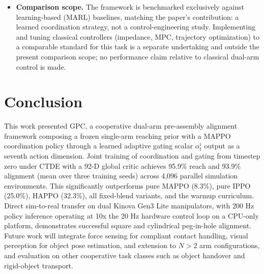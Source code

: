 \documentclass[a4paper,fleqn]{cas-dc}
\begin{document}
\begin{itemize}
\item \textbf{Comparison scope.} The framework is benchmarked exclusively against learning-based (MARL) baselines, matching the paper's contribution: a learned coordination strategy, not a control-engineering study. Implementing and tuning classical controllers (impedance, MPC, trajectory optimization) to a comparable standard for this task is a separate undertaking and outside the present comparison scope; no performance claim relative to classical dual-arm control is made.
\end{itemize}

\section{Conclusion}
\label{conclusion}
This work presented GPC, a cooperative dual-arm pre-assembly alignment framework composing a frozen single-arm reaching prior with a MAPPO coordination policy through a learned adaptive gating scalar $\alpha^{i}_{t}$ output as a seventh action dimension. Joint training of coordination and gating from timestep zero under CTDE with a 92-D global critic achieves 95.9\% reach and 93.9\% alignment (mean over three training seeds) across 4,096 parallel simulation environments. This significantly outperforms pure MAPPO (8.3\%), pure IPPO (25.0\%), HAPPO (32.3\%), all fixed-blend variants, and the warmup curriculum. Direct sim-to-real transfer on dual Kinova Gen3 Lite manipulators, with 200 Hz policy inference operating at 10x the 20 Hz hardware control loop on a CPU-only platform, demonstrates successful square and cylindrical peg-in-hole alignment. Future work will integrate force sensing for compliant contact handling, visual perception for object pose estimation, and extension to $N>2$ arm configurations, and evaluation on other cooperative task classes such as object handover and rigid-object transport.




\end{document}
